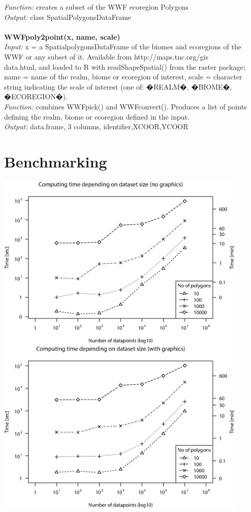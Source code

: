 \documentclass[a4paper,titlepage,11pt]{scrreprt}
\begin{document}
\textit{Function:} creates a subset of the WWF ecoregion Polygons\\
\textit{Output:} class SpatialPolygonsDataFrame\\
\\
\textbf{WWFpoly2point(x, name, scale)}\\
\textit{Input:} x = a SpatialpolygonsDataFrame of the biomes and ecoregions of the WWF or any subset of it. Available from http://maps.tnc.org/gis\\data.html, and loaded to R with readShapeSpatial() from the raster package; name = name of the realm, biome or ecoregion of interest, scale = character string indicating the scale of interest (one of: �REALM�, �BIOME�, �ECOREGION�).\\
\textit{Function:} combines WWFpick() and WWFconvert(). Produces a list of points defining the realm, biome or ecoregion defined in the input.\\
\textit{Output:} data.frame, 3 columns, identifier,XCOOR,YCOOR\\

\chapter{Benchmarking} \label{benchmark}

\centering
\includegraphics[width=0.9\textwidth]{figures/bm_no_graphics.eps}\\
\vspace{2cm}
\includegraphics[width=0.9\textwidth]{figures/bm_graphics.eps}
\end{document}

